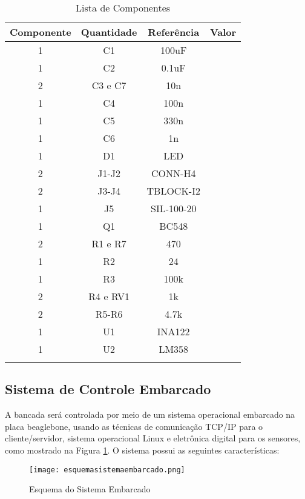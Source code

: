 	\begin{table}[!h]
	\centering
	\caption{Lista de Componentes}
	\vspace{0.5cm}
	\begin{tabular}{c  c  c  c}
	\hline
	\textbf{Componente} & \textbf{Quantidade} & \textbf{Referência}	& \textbf{Valor}\\
	\hline
	1 &	C1	& 100uF\\
	\hline
	1 &	C2 &	0.1uF\\
	\hline
	2 & C3 e C7 & 10n\\
	\hline
	1 &	C4 &	100n\\
	\hline
	1 &	C5 &	330n\\
	\hline
	1 &	C6 &	1n\\
	\hline
	1 &	D1 &	LED\\
	\hline
	2 &	J1-J2 &	CONN-H4\\
	\hline
	2 &	J3-J4 &	TBLOCK-I2\\
	\hline
	1 &	J5 &	SIL-100-20\\
	\hline
	1 &	Q1 &	BC548\\
	\hline
	2 & R1 e R7 & 470\\
	\hline
	1 &	R2 &	24\\
	\hline
	1 &	R3 &	100k\\
	\hline
	2 & R4 e RV1 & 1k\\
	\hline
	2 &	R5-R6 &	4.7k\\
	\hline
	1 &	U1 &	INA122\\
	\hline
	1 &	U2 &	LM358\\
	\hline

	\label{materiais}
	\end{tabular}
	\end{table}


\subsection{Sistema de Controle Embarcado}

	A bancada será controlada por meio de um sistema operacional embarcado na placa beaglebone, usando as técnicas de comunicação TCP/IP para o cliente/servidor, sistema operacional Linux e eletrônica digital para os sensores, como mostrado na Figura \ref{esquema}. O sistema possui as seguintes características:

	\begin{figure}[!h]
		\centering
		\texttt{[image: esquemasistemaembarcado.png]}
		\caption{Esquema do Sistema Embarcado}
		\label{esquema}
	\end{figure}

